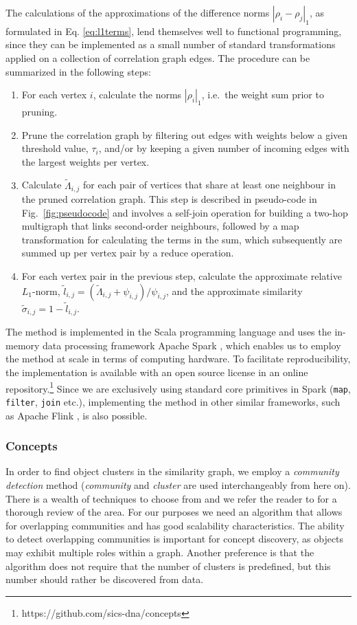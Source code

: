 \documentclass{kais}
\newcommand{\rn}[1]{\rho_{#1}}
\newcommand{\rns}[1]{|\rn{#1}|_1}
\newcommand{\mrn}[1]{\tau_{#1}}
\newcommand{\asy}[1]{\tilde{\sigma}_{#1}}
\newcommand{\dnm}[2]{|\rn{#1}-\rn{#2}|_1}
\begin{document}
The calculations of the approximations of the difference norms
$\dnm{i}{j}$, as formulated in Eq. \ref{eq:l1terms}, lend themselves well to functional
programming, since they can be implemented as a small number of standard transformations applied
on a collection of correlation graph edges. The procedure can be summarized in the following
steps:
\begin{enumerate}
\item For each vertex $i$, calculate the norms $\rns{i}$, i.e.~the weight sum prior
to pruning.
\item Prune the correlation graph by filtering out edges with weights below a given threshold value, $\mrn{i}$, and/or 
by keeping a given number of incoming edges with the largest weights per vertex.
\item Calculate $\tilde{\Lambda}_{i,j}$ for each pair of vertices that share at least one neighbour in the pruned correlation graph.
This step is described in pseudo-code in Fig.\ \ref{fig:pseudocode} and
involves a self-join operation for building a two-hop multigraph that links
second-order neighbours, followed by a map transformation for calculating the
terms in the sum, which subsequently are summed up per vertex pair by a reduce
operation.
\item For each vertex pair in the previous step, calculate the
approximate relative $L_1$-norm, $\tilde{l}_{i,j} =
(\tilde{\Lambda}_{i,j} + \psi_{i,j})/\psi_{i,j}$,
and  the approximate
similarity $\asy{i,j} = 1 - \tilde{l}_{i,j}$.
\end{enumerate}
The method is implemented in the Scala programming language and uses the in-memory
data processing framework Apache Spark \cite{Zaharia-2012}, which enables us
to employ the method at scale in terms of computing hardware.
To facilitate reproducibility, the implementation is available
with an open source license in an online repository.\footnote{https://github.com/sics-dna/concepts}
 Since we are exclusively using standard core primitives in Spark (\texttt{map},
\texttt{filter}, \texttt{join} etc.), implementing the
method in other similar frameworks, such as Apache Flink \cite{Alexandrov14}, is also
possible.

\subsubsection{Concepts}
\label{sec:slpa-implementation}
In order to find object clusters in the similarity graph, we employ a \emph{community detection} 
method (\emph{community} and \emph{cluster} are used interchangeably from here on). 
There is a wealth of techniques to choose from and we refer the reader to 
for a thorough review of the area. For our purposes we need an algorithm that allows for overlapping communities
and has good scalability characteristics. The ability to detect overlapping communities is important for
concept discovery, as objects may exhibit multiple roles within a graph. 
Another preference is that the algorithm does not require that the 
number of clusters is predefined, but this number should rather be discovered from data.
\end{document}
